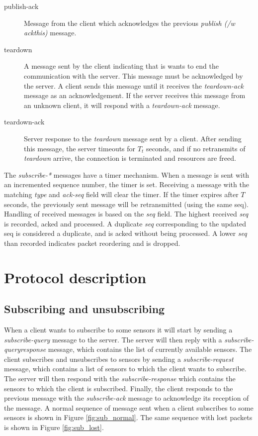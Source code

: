 \documentclass[a4paper]{article}
\begin{document}
\begin{description}
	\item[publish-ack] Message from the client which acknowledges the previous
	\emph{publish (/w ackthis)} message.
    
	\item[teardown] A message sent by the client indicating that is 
	wants to end the communication with the server. This message must be 
	acknowledged by the server. A client sends this message until it receives 
	the \emph{teardown-ack} message as an acknowledgement. If the server 
	receives this message from an unknown client, it will respond with a
	\emph{teardown-ack} message.
    
	\item[teardown-ack] Server response to the \emph{teardown} message
	sent by a client. After sending this message, the server timeouts for $T_t$
    seconds, and if no retransmits of \emph{teardown} arrive, the connection is
    terminated and resources are freed.
\end{description}

The \emph{subscribe-*} messages have a timer mechanism.
When a message is sent with an incremented sequence number, the timer is set.
Receiving a message with the matching \emph{type} and \emph{ack-seq} field will clear the timer.
If the timer expires after $T$ seconds, the previously sent message will be retransmitted (using the same seq).
Handling of received messages is based on the \emph{seq} field.
The highest received \emph{seq} is recorded, acked and processed.
A duplicate \emph{seq} corresponding to the updated seq is considered a duplicate, and is acked without being processed.
A lower \emph{seq} than recorded indicates packet reordering and is dropped.

\section{Protocol description}
\subsection{Subscribing and unsubscribing}
When a client wants to subscribe to some sensors it will start by sending a 
\emph{subscribe-query} message to the server. The server will then reply with
a \emph{subscribe-queryresponse} message, which contains the list of currently
available sensors. The client subscribes and unsubscribes to sensors by sending a 
\emph{subscribe-request} message, which contains a list of sensors to which 
the client wants to subscribe. The server will then respond with the
\emph{subscribe-response} which contains the sensors to which the client is
subscribed. Finally, the client responds to the previous message with the 
\emph{subscribe-ack} message to acknowledge its reception of the message.
A normal sequence of message sent when a client subscribes to some sensors
is shown in Figure \ref{fig:sub_normal}. The same sequence with lost packets 
is shown in Figure \ref{fig:sub_lost}.
\end{document}

